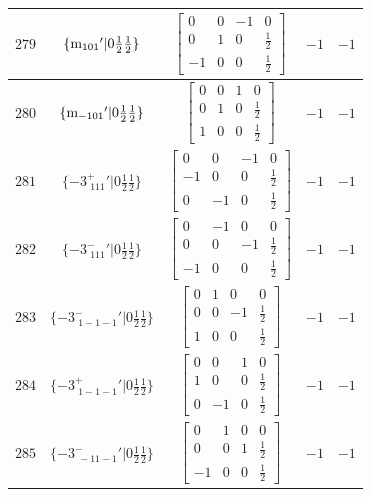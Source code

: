 \documentclass[fleqn,8pt]{jsarticle}
\begin{document}
\begin{longtable}{ccccc}
$ 279 $ & $ \{{\rm m}_{101}{}'|0 \frac{1}{2} \frac{1}{2}\} $ & $ \begin{bmatrix} 0 & 0 & -1 & 0 \\ 0 & 1 & 0 & \frac{1}{2} \\ -1 & 0 & 0 & \frac{1}{2} \end{bmatrix} $ & $ -1 $ & $ -1 $ \\ \hline
$ 280 $ & $ \{{\rm m}_{-101}{}'|0 \frac{1}{2} \frac{1}{2}\} $ & $ \begin{bmatrix} 0 & 0 & 1 & 0 \\ 0 & 1 & 0 & \frac{1}{2} \\ 1 & 0 & 0 & \frac{1}{2} \end{bmatrix} $ & $ -1 $ & $ -1 $ \\ \hline
$ 281 $ & $ \{-3^{+}_{\,\,111}{}'|0 \frac{1}{2} \frac{1}{2}\} $ & $ \begin{bmatrix} 0 & 0 & -1 & 0 \\ -1 & 0 & 0 & \frac{1}{2} \\ 0 & -1 & 0 & \frac{1}{2} \end{bmatrix} $ & $ -1 $ & $ -1 $ \\ \hline
$ 282 $ & $ \{-3^{-}_{\,\,111}{}'|0 \frac{1}{2} \frac{1}{2}\} $ & $ \begin{bmatrix} 0 & -1 & 0 & 0 \\ 0 & 0 & -1 & \frac{1}{2} \\ -1 & 0 & 0 & \frac{1}{2} \end{bmatrix} $ & $ -1 $ & $ -1 $ \\ \hline
$ 283 $ & $ \{-3^{-}_{\,\,1-1-1}{}'|0 \frac{1}{2} \frac{1}{2}\} $ & $ \begin{bmatrix} 0 & 1 & 0 & 0 \\ 0 & 0 & -1 & \frac{1}{2} \\ 1 & 0 & 0 & \frac{1}{2} \end{bmatrix} $ & $ -1 $ & $ -1 $ \\ \hline
$ 284 $ & $ \{-3^{+}_{\,\,1-1-1}{}'|0 \frac{1}{2} \frac{1}{2}\} $ & $ \begin{bmatrix} 0 & 0 & 1 & 0 \\ 1 & 0 & 0 & \frac{1}{2} \\ 0 & -1 & 0 & \frac{1}{2} \end{bmatrix} $ & $ -1 $ & $ -1 $ \\ \hline
$ 285 $ & $ \{-3^{-}_{\,\,-11-1}{}'|0 \frac{1}{2} \frac{1}{2}\} $ & $ \begin{bmatrix} 0 & 1 & 0 & 0 \\ 0 & 0 & 1 & \frac{1}{2} \\ -1 & 0 & 0 & \frac{1}{2} \end{bmatrix} $ & $ -1 $ & $ -1 $ \\ \hline

\end{longtable}
\end{document}
